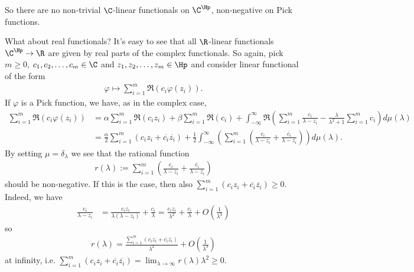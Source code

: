 So there are no non-trivial $\C$-linear functionals on $\C^{\Hp}$, non-negative on Pick functions.

What about real functionals? It's easy to see that all $\R$-linear functionals $\C^{\Hp} \to \R$ are given by real parts of the complex functionals. So again, pick $m \geq 0$, $c_{1}, c_{2}, \ldots, c_{m} \in \C$ and $z_{1}, z_{2}, \ldots, z_{m} \in \Hp$ and consider linear functional of the form
\begin{align*}
	\varphi \mapsto \sum_{i = 1}^{m} \Re\left(c_{i} \varphi(z_{i})\right).
\end{align*}
If $\varphi$ is a Pick function, we have, as in the complex case,
\begin{align*}
	\sum_{i = 1}^{m} \Re(c_{i} \varphi(z_{i})) &= \alpha \sum_{i = 1}^{m} \Re(c_{i} z_{i}) + \beta \sum_{i = 1}^{m} \Re(c_{i}) + \int_{-\infty}^{\infty} \Re\left( \sum_{i = 1}^{m}\frac{c_{i}}{\lambda - z_{i}} - \frac{\lambda}{\lambda^2 + 1} \sum_{i = 1}^{m} c_{i} \right) d \mu(\lambda) \\
	&= \frac{\alpha}{2} \sum_{i = 1}^{m} \left(c_{i} z_{i} + \overline{c_{i}} \overline{z_{i}}\right) + \frac{1}{2}\int_{-\infty}^{\infty} \left( \sum_{i = 1}^{m} \left(\frac{c_{i}}{\lambda - z_{i}} + \frac{\overline{c_{i}}}{\lambda - \overline{z_{i}}}\right)\right) d \mu(\lambda).
\end{align*}
By setting $\mu = \delta_{\lambda}$ we see that the rational function
\begin{align*}
	r(\lambda) := \sum_{i = 1}^{m} \left(\frac{c_{i}}{\lambda - z_{i}} + \frac{\overline{c_{i}}}{\lambda - \overline{z_{i}}}\right)
\end{align*}
should be non-negative. If this is the case, then also $\sum_{i = 1}^{m} \left(c_{i} z_{i} + \overline{c_{i}} \overline{z_{i}}\right) \geq 0$. Indeed, we have
\begin{align*}
	\frac{c_{i}}{\lambda - z_{i}} &= \frac{c_{i} z_{i}}{\lambda (\lambda - z_{i})} + \frac{c_{i}}{\lambda} = \frac{c_{i} z_{i}}{\lambda^2} + \frac{c_{i}}{\lambda} + O(\frac{1}{\lambda^{3}})
\end{align*}
so
\begin{align*}
	r(\lambda) = \frac{\sum_{i = 1}^{m} \left(c_{i} z_{i} + \overline{c_{i}} \overline{z_{i}}\right)}{\lambda^{2}} + O\left(\frac{1}{\lambda^{3}}\right)
\end{align*}
at infinity, i.e. $\sum_{i = 1}^{m} \left(c_{i} z_{i} + \overline{c_{i}} \overline{z_{i}}\right) = \lim_{\lambda \to \infty} r(\lambda) \lambda^{2} \geq 0$.





